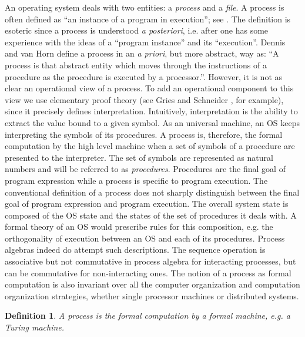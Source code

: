 \documentclass[draft]{article}
\newcounter{thedefn}
\newtheorem{mydefinition}[thedefn]{Definition}
\begin{document}
An operating  system deals with  two entities: a \emph{process}  and a
\emph{file}.  A process is often defined as ``an instance of a program
in   execution'';   see  \cite{Denning:1971:TGC:356593.356595}.    The
definition  is   esoteric  since  a  process   is  understood  \emph{a
  posteriori}, i.e. after one has  some experience with the ideas of a
``program  instance''  and its  ``execution''.   Dennis  and van  Horn
\cite{Dennis:1966:PSM:365230.365252}  define a  process in  an \emph{a
  priori}, but  more abstract,  way as: ``A  process is  that abstract
entity  which moves  through the  instructions of  a procedure  as the
procedure is executed by a  processor.''.  However, it is not as clear
an operational view of a  process.  To add an operational component to
this  view we  use elementary  proof theory  (see Gries  and Schneider
\cite{Gries:1993:LAD:161182}, for example), since it precisely defines
interpretation.  Intuitively, interpretation is the ability to extract
the value  bound to a  given symbol.  As  an universal machine,  an OS
keeps  interpreting the  symbols  of its  procedures.   A process  is,
therefore, the formal computation by the high level machine when a set
of symbols of  a procedure are presented to  the interpreter.  The set
of symbols are represented as  natural numbers and will be referred to
as  \emph{procedures}.   Procedures  are  the final  goal  of  program
expression  while a  process is  specific to  program  execution.  The
conventional  definition of  a  process does  not sharply  distinguish
between the  final goal of  program expression and  program execution.
The overall system state is composed of the OS state and the states of
the set of  procedures it deals with.  A formal theory  of an OS would
prescribe  rules  for this  composition,  e.g.   the orthogonality  of
execution between an OS and  each of its procedures.  Process algebras
indeed  do  attempt  such  descriptions.  The  sequence  operation  is
associative  but not  commutative in  process algebra  for interacting
processes,  but  can be  commutative  for  non-interacting ones.   The
notion of a  process as formal computation is  also invariant over all
the  computer organization  and  computation organization  strategies,
whether single processor machines or distributed systems.


\begin{mydefinition}
  \label{def:process}
  A  \emph{process} is  the formal  computation by  a  formal machine,
  e.g. a Turing machine.
\end{mydefinition}
\end{document}
